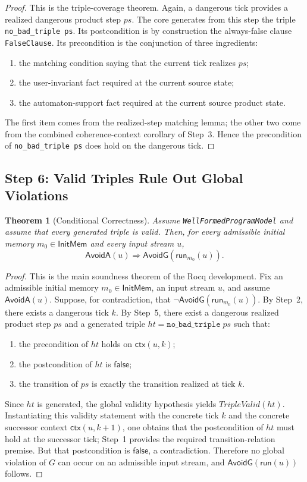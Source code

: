 \documentclass[11pt,a4paper]{article}
\newtheorem{theorem}[definition]{Theorem}
\newcommand{\False}{\mathsf{false}}
\newcommand{\AvoidA}{\mathsf{AvoidA}}
\newcommand{\AvoidG}{\mathsf{AvoidG}}
\newcommand{\run}{\mathsf{run}}
\newcommand{\ctx}{\mathsf{ctx}}
\begin{document}
\begin{proof}
This is the triple-coverage theorem. Again, a dangerous tick
provides a realized dangerous product step \(ps\). The core generates from this
step the triple \texttt{no\_bad\_triple ps}. Its postcondition is by
construction the always-false clause \texttt{FalseClause}. Its precondition is
the conjunction of three ingredients:
\begin{enumerate}[leftmargin=1.4em]
\item the matching condition saying that the current tick realizes \(ps\);
\item the user-invariant fact required at the current source state;
\item the automaton-support fact required at the current source product state.
\end{enumerate}
The first item comes from the realized-step matching lemma; the other two come
from the combined coherence-context corollary of Step~3. Hence the
precondition of \texttt{no\_bad\_triple ps} does hold on the dangerous tick.
\end{proof}

\subsection{Step 6: Valid Triples Rule Out Global Violations}

\begin{theorem}[Conditional Correctness]
Assume \texttt{WellFormedProgramModel} and assume that every generated triple is
valid. Then, for every admissible initial memory \(m_0 \in \mathsf{InitMem}\) and every
input stream \(u\),
\[
\AvoidA(u) \Rightarrow \AvoidG(\run_{m_0}(u)).
\]
\end{theorem}

\begin{proof}
This is the main soundness theorem of the Rocq development. Fix an admissible
initial memory \(m_0 \in \mathsf{InitMem}\), an input stream \(u\), and assume
\(\AvoidA(u)\). Suppose, for contradiction,
that \(\neg \AvoidG(\run_{m_0}(u))\). By Step~2, there exists a dangerous tick
\(k\). By Step~5, there exist a dangerous realized
product step \(ps\) and a generated triple
\(ht = \texttt{no\_bad\_triple}\;ps\) such that:
\begin{enumerate}[leftmargin=1.4em]
\item the precondition of \(ht\) holds on \(\ctx(u,k)\);
\item the postcondition of \(ht\) is \(\False\);
\item the transition of \(ps\) is exactly the transition realized at tick \(k\).
\end{enumerate}
Since \(ht\) is generated, the global validity hypothesis yields
\(TripleValid(ht)\). Instantiating this validity statement with the concrete
tick \(k\) and the concrete successor context \(\ctx(u,k+1)\), one obtains that
the postcondition of \(ht\) must hold at the successor tick; Step~1 provides
the required transition-relation premise. But that
postcondition is \(\False\), a contradiction. Therefore no global violation of
\(G\) can occur on an admissible input stream, and \(\AvoidG(\run(u))\) follows.
\end{proof}
\end{document}
